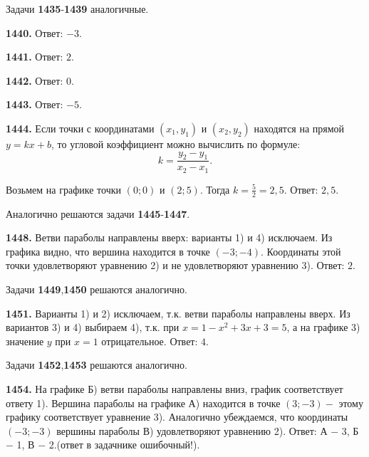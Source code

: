 Задачи \textbf{1435}-\textbf{1439}  аналогичные.

\textbf{1440.} \newline \null \hspace*{\fill} Ответ: $-3$.   

\textbf{1441.} \newline \null \hspace*{\fill} Ответ: $2$.  

\textbf{1442.} \newline \null \hspace*{\fill} Ответ: $0$.     

\textbf{1443.} \newline \null \hspace*{\fill} Ответ: $-5$.   

\textbf{1444.} Если точки с координатами $(x_1,y_1)$ и $(x_2,y_2)$ находятся на прямой $y=kx+b$, то угловой коэффициент можно вычислить по формуле:$$k=\frac{y_2-y_1}{x_2-x_1}.$$

Возьмем на графике точки $(0;0)$ и $(2;5)$. Тогда $k=\frac{5}{2}=2,5$. \newline \null \hspace*{\fill} Ответ: $2,5$. 

Аналогично решаются задачи \textbf{1445}-\textbf{1447}.

\textbf{1448.} Ветви параболы направлены вверх: варианты  1) и 4) исключаем. Из графика видно, что вершина находится в точке $(-3;-4)$. Координаты этой точки удовлетворяют уравнению 2) и не удовлетворяют уравнению 3). \newline \null \hspace*{\fill} Ответ: $2$. 

Задачи \textbf{1449},\textbf{1450} решаются аналогично.

\textbf{1451.}  Варианты 1) и 2) исключаем, т.к. ветви параболы направлены вверх. Из вариантов 3) и 4) выбираем 4), т.к. при $x=1-x^2+3x+3=5$, а на графике 3) значение $y$ при $x=1$ отрицательное. \newline \null \hspace*{\fill} Ответ: $4$. 

Задачи \textbf{1452},\textbf{1453} решаются аналогично.

\textbf{1454.} На графике Б) ветви параболы направлены вниз, график соответствует ответу 1). Вершина параболы на графике А) находится в точке $(3;-3)-$ этому графику соответствует уравнение 3). Аналогично убеждаемся, что координаты $(-3;-3)$ вершины параболы В) удовлетворяют уравнению  2). \newline \null \hspace*{\fill} Ответ: А $-$ 3, Б $-$ 1, В $-$ 2.(ответ в задачнике ошибочный!). 

